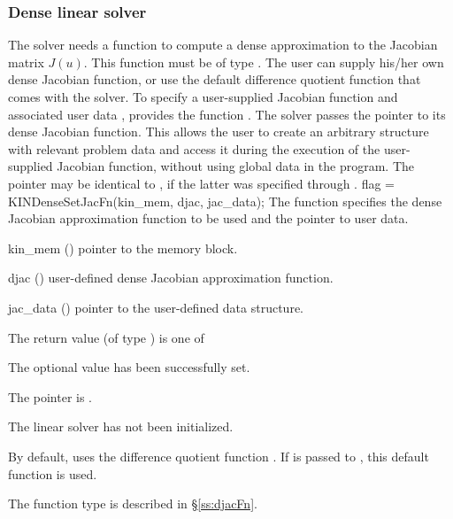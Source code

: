 \subsubsection{Dense linear solver}\label{sss:optin_dense}
The 
{\kindense} solver needs a function to compute a dense approximation to
the Jacobian matrix $J(u)$.  This function must be of type . 
The user can supply his/her own dense Jacobian function, or use the default 
difference quotient function  
that comes with the {\kindense} solver.
To specify a user-supplied Jacobian function  and associated user 
data , {\kindense} provides the function .
The {\kindense} solver passes the pointer  
to its dense Jacobian function. This allows the user to
create an arbitrary structure with relevant problem data and access it
during the execution of the user-supplied Jacobian function, without
using global data in the program.  The pointer  may be
identical to , if the latter was specified through .
{
  flag = KINDenseSetJacFn(kin\_mem, djac, jac\_data);
}
{
  The function  specifies the dense Jacobian
  approximation function to be used and the pointer to user data.
}
{
  \begin{args}
  \item[kin\_mem] ()
    pointer to the {\kinsol} memory block.
  \item[djac] ()
    user-defined dense Jacobian approximation function.
  \item[jac\_data] ()
    pointer to the user-defined data structure.
  \end{args}
}
{
  The return value  (of type ) is one of
  \begin{args}
  \item[\Id{KINDENSE\_SUCCESS}] 
    The optional value has been successfully set.
  \item[\Id{KINDENSE\_MEM\_NULL}]
    The  pointer is .
  \item[\Id{KINDENSE\_LMEM\_NULL}]
    The {\kindense} linear solver has not been initialized.
  \end{args}
}
{
  By default, {\kindense} uses the difference quotient function .
  If  is passed to , this default function is used.

  The function type  is described in \S\ref{ss:djacFn}.
}

